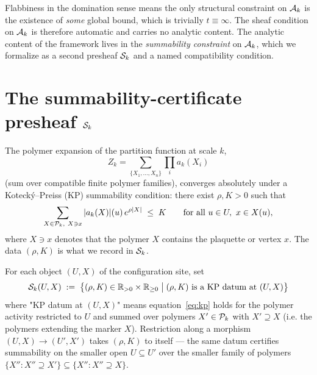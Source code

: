 \begin{remark}
\label{rem:flabby-buys}
Flabbiness in the domination sense means the only structural constraint on $\mathcal{A}_k$ is the existence of \emph{some} global bound, which is trivially $t \equiv \infty$.  The sheaf condition on $\mathcal{A}_k$ is therefore automatic and carries no analytic content.  The analytic content of the framework lives in the \emph{summability constraint} on $\mathcal{A}_k$, which we formalize as a second presheaf $\mathcal{S}_k$ and a named compatibility condition.
\end{remark}

\section{The summability-certificate presheaf $\mathcal{S}_k$}
\label{sec:scertif}

The polymer expansion of the partition function at scale $k$,
\begin{equation*}
  Z_k = \sum_{\{X_1, \ldots, X_n\}} \prod_i a_k(X_i)
\end{equation*}
(sum over compatible finite polymer families), converges absolutely under a Kotecký--Preiss (KP) summability condition: there exist $\rho, K > 0$ such that
\begin{equation}
  \label{eq:kp}
  \sum_{X \in \mathcal{P}_k,\ X \ni x} |a_k(X)|(u)\, e^{\rho |X|} \;\le\; K
  \qquad \text{for all } u \in U,\ x \in X(u),
\end{equation}
where $X \ni x$ denotes that the polymer $X$ contains the plaquette or vertex $x$.  The data $(\rho, K)$ is what we record in $\mathcal{S}_k$.

\begin{definition}
\label{def:Skpresheaf}
For each object $(U, X)$ of the configuration site, set
\begin{equation*}
  \mathcal{S}_k(U, X) \;:=\; \big\{ (\rho, K) \in \mathbb{R}_{> 0} \times \mathbb{R}_{\ge 0} \;\big|\; (\rho, K) \text{ is a KP datum at } (U, X) \big\}
\end{equation*}
where "KP datum at $(U, X)$" means equation~\eqref{eq:kp} holds for the polymer activity restricted to $U$ and summed over polymers $X' \in \mathcal{P}_k$ with $X' \supseteq X$ (i.e. the polymers extending the marker $X$).  Restriction along a morphism $(U, X) \to (U', X')$ takes $(\rho, K)$ to itself --- the same datum certifies summability on the smaller open $U \subseteq U'$ over the smaller family of polymers $\{X'' : X'' \supseteq X'\} \subseteq \{X'' : X'' \supseteq X\}$.
\end{definition}

